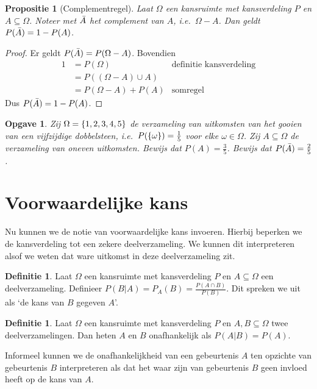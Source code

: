 \documentclass[a4paper]{book}
\newtheorem{proposition}[theorem]{Propositie}
\newtheorem{exercise}[theorem]{Opgave}
\theoremstyle{definition}
\newtheorem{definition}[theorem]{Definitie}
\begin{document}
\begin{proposition}[Complementregel]\label{complementregel}
    Laat $\Omega$ een kansruimte met kansverdeling $P$ en $A \subseteq \Omega$.
    Noteer met $\compl{A}$ het complement van $A$, i.e.\ $\Omega - A$.
    Dan geldt $P(\compl{A}) = 1 - P(A)$.
\end{proposition}
\begin{proof}
    Er geldt $P(\compl{A}) = P(\Omega - A)$.
    Bovendien
    \begin{align*}
        1 &= P(\Omega) & \text{definitie kansverdeling}\\
          &= P( (\Omega - A) \cup A) \\
          &= P(\Omega - A) + P(A) & \text{somregel}
    \end{align*}
    Dus $P(\compl{A}) = 1 - P(A)$.
\end{proof}


\begin{exercise}
    Zij $\Omega = \set{1,2,3,4,5}$ de verzameling van uitkomsten van het gooien van een vijfzijdige dobbelsteen,
    i.e.\ $P(\set{\omega}) = \frac{1}{5}$ voor elke $\omega \in \Omega$.
    Zij $A \subseteq \Omega$ de verzameling van oneven uitkomsten.
    Bewijs dat $P(A) = \frac{3}{5}$.
    Bewijs dat $P(\compl{A}) = \frac{2}{5}$.
\end{exercise}


\section{Voorwaardelijke kans}
Nu kunnen we de notie van voorwaardelijke kans invoeren.
Hierbij beperken we de kansverdeling tot een zekere deelverzameling.
We kunnen dit interpreteren alsof we weten dat ware uitkomst in deze deelverzameling zit.
\begin{definition}
    Laat $\Omega$ een kansruimte met kansverdeling $P$ en $A \subseteq \Omega$ een deelverzameling.
    Definieer $P(B|A) = P_A(B) = \frac{P(A \cap B)}{P(B)}$. Dit spreken we uit als `de kans van $B$ gegeven $A$'.
\end{definition}

\begin{definition}
    Laat $\Omega$ een kansruimte met kansverdeling $P$ en $A,B \subseteq \Omega$ twee deelverzamelingen.
    Dan heten $A$ en $B$ onafhankelijk als $P(A|B) = P(A)$.
\end{definition}

Informeel kunnen we de onafhankelijkheid van een gebeurtenis $A$ ten opzichte van gebeurtenis $B$ interpreteren als dat het waar zijn van gebeurtenis $B$
geen invloed heeft op de kans van $A$.
\end{document}
